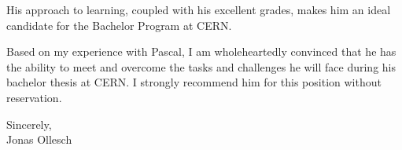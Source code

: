 \documentclass[12pt]{article}
\begin{document}
His approach to learning, coupled with his excellent grades, makes him an ideal candidate for the Bachelor Program at CERN.

\vspace{.5cm}

Based on my experience with Pascal, I am wholeheartedly convinced that he has the ability to meet and overcome the tasks and challenges he will face during his bachelor thesis at CERN. 
I strongly recommend him for this position without reservation.

\vspace{1cm}

Sincerely, \\
Jonas Ollesch
\end{document}
